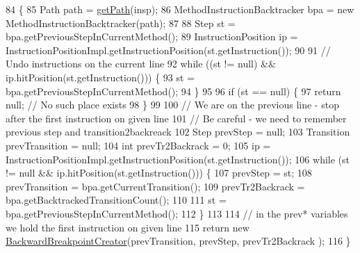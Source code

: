 \begin{DoxyCode}
84                                                                                     \{
85     Path path = \hyperlink{classgov_1_1nasa_1_1jpf_1_1inspector_1_1server_1_1pathanalysis_1_1_backward_breakpoint_creator_a8e3d15618550a3067d26457ca3a5fa49}{getPath}(insp);
86     MethodInstructionBacktracker bpa = \textcolor{keyword}{new} MethodInstructionBacktracker(path);
87 
88     Step st = bpa.getPreviousStepInCurrentMethod();
89     InstructionPosition ip = InstructionPositionImpl.getInstructionPosition(st.getInstruction());
90 
91     \textcolor{comment}{// Undo instructions on the current line}
92     \textcolor{keywordflow}{while} ((st != null) && ip.hitPosition(st.getInstruction())) \{
93       st = bpa.getPreviousStepInCurrentMethod();
94     \}
95 
96     \textcolor{keywordflow}{if} (st == null) \{
97       \textcolor{keywordflow}{return} null; \textcolor{comment}{// No such place exists}
98     \}
99 
100     \textcolor{comment}{// We are on the previous line - stop after the first instruction on given line}
101     \textcolor{comment}{// Be careful - we need to remember previous step and transition2backreack}
102     Step prevStep = null;
103     Transition prevTransition = null;
104     \textcolor{keywordtype}{int} prevTr2Backrack = 0;
105     ip = InstructionPositionImpl.getInstructionPosition(st.getInstruction());
106     \textcolor{keywordflow}{while} (st != null && ip.hitPosition(st.getInstruction())) \{
107       prevStep = st;
108       prevTransition = bpa.getCurrentTransition();
109       prevTr2Backrack = bpa.getBacktrackedTransitionCount();
110 
111       st = bpa.getPreviousStepInCurrentMethod();
112     \}
113 
114     \textcolor{comment}{// in the prev* variables we hold the first instruction on given line}
115     \textcolor{keywordflow}{return} \textcolor{keyword}{new} \hyperlink{classgov_1_1nasa_1_1jpf_1_1inspector_1_1server_1_1pathanalysis_1_1_backward_breakpoint_creator_ab7493637884e06f11642dbe8234e7c39}{BackwardBreakpointCreator}(prevTransition, prevStep, prevTr2Backrack
      );
116   \}
\end{DoxyCode}
